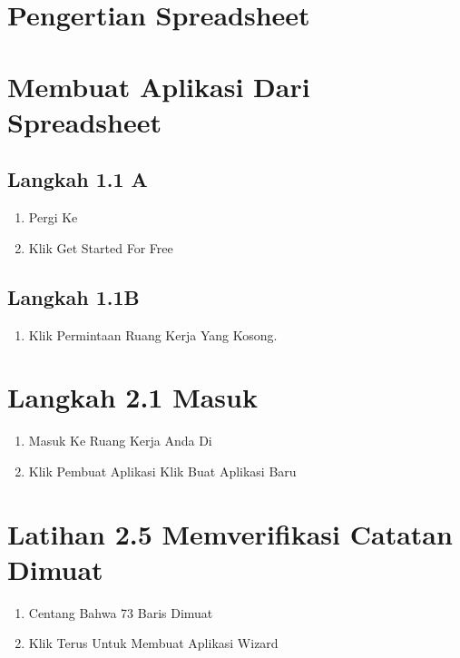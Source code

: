\documentclass{article}
\begin{document}
\section{Pengertian Spreadsheet}
\usepackage{Spreadsheet: Memungkinkan Pengguna Untuk Menyimpan Berbagai Informasi Yang Sangat Lengkap, Pada Setiap Kolomnya Bisa Menyimpan Berbagai Data Informasi Yang Berbeda Dari Informasi Yang Di Perlukan.App From Spreadsheet Disini Berupa Beberapa Project Dan Nama Tugas Nya Serta Keterangan Lainnya Seperti Tanggal Mulai, Tanggal Selesai, Status, Di Ttd Oleh,Biaya, Budget Tersedia, Dan Lebih Kurangnya Dari Budget.}

\section{Membuat Aplikasi Dari Spreadsheet}
\subsection{Langkah 1.1 A}
\begin{enumerate}
    \item Pergi Ke 
    \item Klik Get Started For Free

\end{enumerate}
\subsection{Langkah 1.1B}
\begin{enumerate}
    \item Klik Permintaan Ruang Kerja Yang Kosong.
\end{enumerate}
\section{Langkah 2.1 Masuk}
\begin{enumerate}
    \item Masuk Ke Ruang Kerja Anda Di 
    \item Klik Pembuat Aplikasi Klik Buat Aplikasi Baru

\end{enumerate}
\section{Latihan 2.5 Memverifikasi Catatan Dimuat}
\begin{enumerate}
    \item  Centang Bahwa 73 Baris Dimuat
    \item Klik Terus Untuk Membuat Aplikasi Wizard

\end{enumerate}
\end{document}
